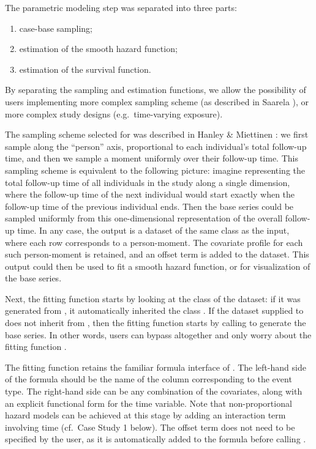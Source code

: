 The parametric modeling step was separated into three parts:

\begin{enumerate}
\def\labelenumi{\arabic{enumi}.}
\tightlist
\item
  case-base sampling;
\item
  estimation of the smooth hazard function;
\item
  estimation of the survival function.
\end{enumerate}

By separating the sampling and estimation functions, we allow the
possibility of users implementing more complex sampling scheme (as
described in Saarela \citeyearpar{saarela2016case}), or more complex
study designs (e.g.~time-varying exposure).

The sampling scheme selected for  was described in
Hanley \& Miettinen \citeyearpar{hanley2009fitting}: we first sample
along the ``person'' axis, proportional to each individual's total
follow-up time, and then we sample a moment uniformly over their
follow-up time. This sampling scheme is equivalent to the following
picture: imagine representing the total follow-up time of all
individuals in the study along a single dimension, where the follow-up
time of the next individual would start exactly when the follow-up time
of the previous individual ends. Then the base series could be sampled
uniformly from this one-dimensional representation of the overall
follow-up time. In any case, the output is a dataset of the same class
as the input, where each row corresponds to a person-moment. The
covariate profile for each such person-moment is retained, and an offset
term is added to the dataset. This output could then be used to fit a
smooth hazard function, or for visualization of the base series.

Next, the fitting function  starts by looking at
the class of the dataset: if it was generated from
, it automatically inherited the class
. If the dataset supplied to  does
not inherit from , then the fitting function starts by
calling  to generate the base series. In other
words, users can bypass  altogether and only worry
about the fitting function .

The fitting function retains the familiar formula interface of
. The left-hand side of the formula should be the name of the
column corresponding to the event type. The right-hand side can be any
combination of the covariates, along with an explicit functional form
for the time variable. Note that non-proportional hazard models can be
achieved at this stage by adding an interaction term involving time
(cf.~Case Study 1 below). The offset term does not need to be specified
by the user, as it is automatically added to the formula before calling
.

